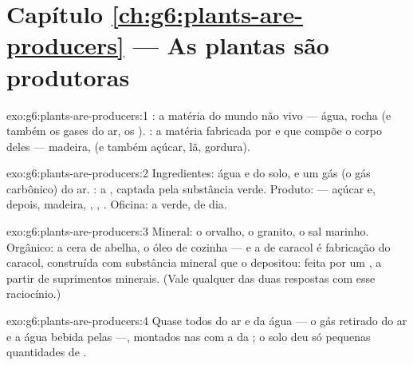 \section*{Capítulo \ref{ch:g6:plants-are-producers} --- As plantas são produtoras}

\begin{solution}{exo:g6:plants-are-producers:1}
: a matéria do mundo não vivo --- água, rocha (e
também os gases do ar, os ). : a
matéria fabricada por  e que compõe o corpo deles ---
madeira,  (e também açúcar, lã, gordura).
\end{solution}

\begin{solution}{exo:g6:plants-are-producers:2}
Ingredientes: água e  do solo, e um gás (o gás
carbônico) do ar. : a , captada pela substância verde.
Produto:  --- açúcar e, depois, madeira, , ,
. Oficina: a  verde, de dia.
\end{solution}

\begin{solution}{exo:g6:plants-are-producers:3}
Mineral: o orvalho, o granito, o sal marinho. Orgânico: a cera de
abelha, o óleo de cozinha --- e a  de caracol é fabricação do
caracol, construída com substância mineral que o  depositou:
feita por um , a partir de suprimentos minerais. (Vale
qualquer das duas respostas com esse raciocínio.)
\end{solution}

\begin{solution}{exo:g6:plants-are-producers:4}
Quase todos do ar e da água --- o gás retirado do ar e a água bebida
pelas  ---, montados nas  com a  da ; o solo deu
só pequenas quantidades de .
\end{solution}

